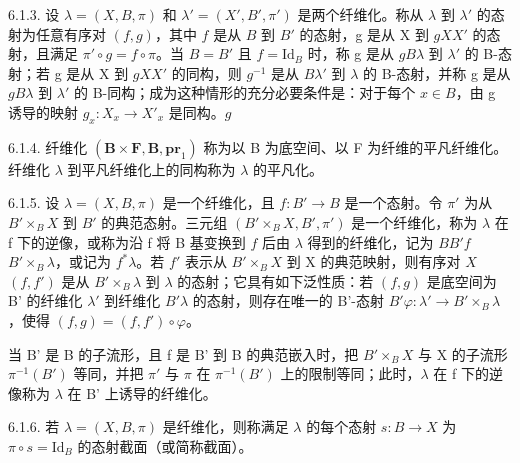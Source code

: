 6.1.3. 设 \(\lambda = (X, B, \pi)\) 和 \(\lambda' = (X', B', \pi')\) 是两个纤维化。称从 \(\lambda\) 到 \(\lambda'\) 的态射为任意有序对 \((f, g)\)，其中 \(f\) 是从 \(B\) 到 \(B'\) 的态射，g 是从 X 到 \(g\)\(X\)\(X'\) 的态射，且满足 \(\pi' \circ g = f \circ \pi\)。当 \(B = B'\) 且 \(f = \mathrm{Id}_B\) 时，称 g 是从 \(g\)\(B\)\(\lambda\) 到 \(\lambda'\) 的 B-态射；若 g 是从 X 到 \(g\)\(X\)\(X'\) 的同构，则 \(g^{-1}\) 是从 \(B\)\(\lambda'\) 到 \(\lambda\) 的 B-态射，并称 g 是从 \(g\)\(B\)\(\lambda\) 到 \(\lambda'\) 的 B-同构；成为这种情形的充分必要条件是：对于每个 \(x \in B\)，由 g 诱导的映射 \(g_x: X_x \to X'_x\) 是同构。\(g\)

6.1.4. 纤维化 \((\mathbf{B} \times \mathbf{F}, \mathbf{B}, \mathbf{pr}_{1})\) 称为以 B 为底空间、以 F 为纤维的平凡纤维化。纤维化 \(\lambda\) 到平凡纤维化上的同构称为 \(\lambda\) 的平凡化。

6.1.5. 设 \(\lambda = (X, B, \pi)\) 是一个纤维化，且 \(f: B' \to B\) 是一个态射。令 \(\pi'\) 为从 \(B' \times_B X\) 到 \(B'\) 的典范态射。三元组 \((B' \times_B X, B', \pi')\) 是一个纤维化，称为 \(\lambda\) 在 f 下的逆像，或称为沿 f 将 B 基变换到 \(f\) 后由 \(\lambda\) 得到的纤维化，记为 \(B\)\(B'\)\(f\)\(B' \times_B \lambda\)，或记为 \(f^*\lambda\)。若 \(f'\) 表示从 \(B' \times_B X\) 到 X 的典范映射，则有序对 \(X\)\((f, f')\) 是从 \(B' \times_B \lambda\) 到 \(\lambda\) 的态射；它具有如下泛性质：若 \((f, g)\) 是底空间为 B' 的纤维化 \(\lambda'\) 到纤维化 \(B'\)\(\lambda\) 的态射，则存在唯一的 B'-态射 \(B'\)\(\varphi: \lambda' \to B' \times_B \lambda\)，使得 \((f, g) = (f, f') \circ \varphi\)。

当 B' 是 B 的子流形，且 f 是 B' 到 B 的典范嵌入时，把 \(B' \times_{B} X\) 与 X 的子流形 \(\pi^{-1}(B')\) 等同，并把 \(\pi'\) 与 \(\pi\) 在 \(\pi^{-1}(B')\) 上的限制等同；此时，\(\lambda\) 在 f 下的逆像称为 \(\lambda\) 在 B' 上诱导的纤维化。

6.1.6. 若 \(\lambda = (X, B, \pi)\) 是纤维化，则称满足 \(\lambda\) 的每个态射 \(s: B \to X\) 为 \(\pi \circ s = \mathrm{Id}_B\) 的态射截面（或简称截面）。

